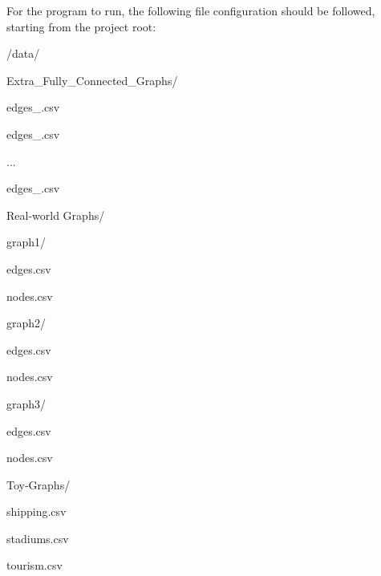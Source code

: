 For the program to run, the following file configuration should be followed, starting from the project root\+:


\begin{DoxyItemize}
\item /data/
\begin{DoxyItemize}
\item Extra\+\_\+\+Fully\+\_\+\+Connected\+\_\+\+Graphs/
\begin{DoxyItemize}
\item edges\+\_.\+csv
\item edges\+\_.\+csv
\item ...
\item edges\+\_.\+csv
\end{DoxyItemize}
\item Real-\/world Graphs/
\begin{DoxyItemize}
\item graph1/
\begin{DoxyItemize}
\item edges.\+csv
\item nodes.\+csv
\end{DoxyItemize}
\item graph2/
\begin{DoxyItemize}
\item edges.\+csv
\item nodes.\+csv
\end{DoxyItemize}
\item graph3/
\begin{DoxyItemize}
\item edges.\+csv
\item nodes.\+csv
\end{DoxyItemize}
\end{DoxyItemize}
\item Toy-\/\+Graphs/
\begin{DoxyItemize}
\item shipping.\+csv
\item stadiums.\+csv
\item tourism.\+csv
\end{DoxyItemize}
\end{DoxyItemize}
\end{DoxyItemize}

 